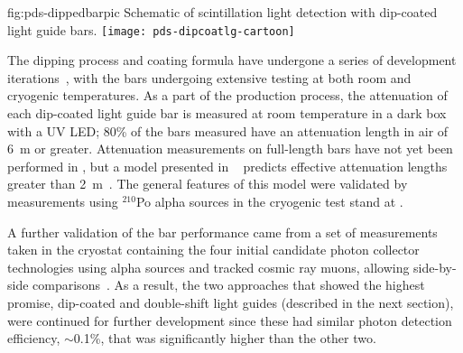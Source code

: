 \begin{dunefigure}{fig:pds-dippedbarpic}
{Schematic of scintillation light detection with dip-coated light guide bars.}
  \texttt{[image: pds-dipcoatlg-cartoon]}
\end{dunefigure}


The dipping process and coating formula have undergone a series of development iterations~\cite{Moss:2014ota},
with the bars undergoing extensive testing at both room and cryogenic temperatures.
As a part of the production process, the attenuation of each dip-coated light guide bar is measured at room temperature in a dark box with a UV LED; 80\% of the bars measured have an attenuation length in air of \SI{6}{m} or greater.   
Attenuation measurements on full-length bars have not yet been performed in \lar, but a model presented in ~\cite{Moss:2014ota} predicts effective attenuation lengths greater than \SI{2}{m}~\cite{Moss:2016yhb}.  The general features of this model were validated by measurements using $^{210}$Po alpha sources in the  cryogenic test stand at .

A further validation of the bar performance came from a set of measurements taken in the  cryostat containing the four initial candidate photon collector technologies using alpha sources and tracked cosmic ray muons, allowing side-by-side comparisons~\cite{Whittington:2015rkr}.  As a result, the two approaches that showed the highest promise, dip-coated and double-shift light guides (described in the next section), were continued for further development since these had similar photon detection efficiency, $\sim$0.1\%, that was significantly higher than the other two. 


